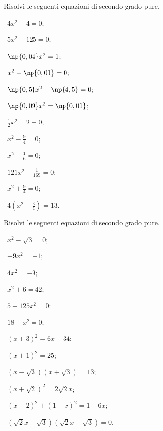 \begin{esercizio}[\Ast]
 \label{ese:3.3}
Risolvi le seguenti equazioni di secondo grado pure.
\begin{multicols}{3}
 \begin{enumeratea}
 \item~$4 x^{2} - 4 = 0$;
 \item~$5 x^{2} - 125 = 0$;
 \item~$\np{0,04} x^{2} = 1$;
 \item~$x^{2} - \np{0,01} = 0$;
 \item~$\np{0,5} x^{2} - \np{4,5} = 0$;
 \item~$\np{0,09} x^{2} = \np{0,01}$;
 \item~$\frac{1}{2} x^{2} - 2 = 0$;
 \item~$x^{2} - \frac{9}{4} = 0$;
 \item~$x^{2} - \frac{1}{6} = 0$;
 \item~$121 x^{2} - \frac{1}{169} = 0$;
 \item~$x^{2} + \frac{9}{4} = 0$;
 \item~$4 \left(x^{2}-\frac{3}{4}\right)= 13$.
 \end{enumeratea}
 \end{multicols}
\end{esercizio}

\begin{esercizio}[\Ast]
 \label{ese:3.4}
Risolvi le seguenti equazioni di secondo grado pure.
\begin{multicols}{2}
 \begin{enumeratea}
 \item~$x^{2} - \sqrt{3} = 0$;
 \item~$- 9 x^{2} = - 1$;
 \item~$4 x^{2} = - 9$;
 \item~$x^{2} + 6 = 42$;
 \item~$5 - 125 x^{2} = 0$;
 \item~$18 - x^{2} = 0$;
 \item~$(x + 3)^{2} = 6 x + 34$;
 \item~$(x + 1)^{2} = 25$;
 \item~$(x - \sqrt{3}) (x + \sqrt{3}) = 13$;
 \item~$(x + \sqrt{2})^{2} = 2 \sqrt{2} x$;
 \item~$(x - 2)^{2} + (1 - x)^{2} = 1 - 6x$;
 \item~$(\sqrt{2} x - \sqrt{3}) (\sqrt{2} x + \sqrt{3}) = 0$.
 \end{enumeratea}
 \end{multicols}
\end{esercizio}


